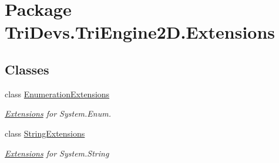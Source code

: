 \hypertarget{namespace_tri_devs_1_1_tri_engine2_d_1_1_extensions}{\section{Package Tri\-Devs.\-Tri\-Engine2\-D.\-Extensions}
\label{namespace_tri_devs_1_1_tri_engine2_d_1_1_extensions}
}
\subsection*{Classes}
\begin{DoxyCompactItemize}
\item 
class \hyperlink{class_tri_devs_1_1_tri_engine2_d_1_1_extensions_1_1_enumeration_extensions}{Enumeration\-Extensions}
\begin{DoxyCompactList}\small\item\em \hyperlink{namespace_tri_devs_1_1_tri_engine2_d_1_1_extensions}{Extensions} for System.\-Enum. \end{DoxyCompactList}\item 
class \hyperlink{class_tri_devs_1_1_tri_engine2_d_1_1_extensions_1_1_string_extensions}{String\-Extensions}
\begin{DoxyCompactList}\small\item\em \hyperlink{namespace_tri_devs_1_1_tri_engine2_d_1_1_extensions}{Extensions} for System.\-String \end{DoxyCompactList}\end{DoxyCompactItemize}
